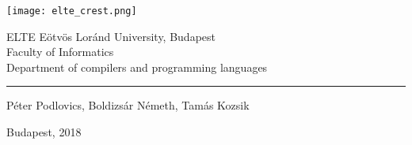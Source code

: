 \documentclass[main.tex]{subfiles}
\begin{document}
	\newcommand{\DEPARTMENT}[0]{Department of compilers and programming languages}
	
	\begin{titlepage}
		
		\begin{minipage}{0.3\linewidth}
			\texttt{[image: elte\_crest.png]}
		\end{minipage}
		\begin{minipage}{0.7\linewidth}
			\begin{center}
				\large
				ELTE Eötvös Loránd University, Budapest \\
				Faculty of Informatics \\
				\DEPARTMENT
			\end{center}
		\end{minipage}
		
		\hrule
		\vfill
		
		\begin{center}
			\Huge
			\makeatletter
			\textbf{\@title}
			\makeatother
			\normalsize
		\end{center}
		
		\hspace{3cm}
		
		\begin{center}
			\LARGE
			Péter Podlovics, Boldizsár Németh, Tamás Kozsik
		\end{center}
		
		\vfill
		
		\begin{center}
			\large
			Budapest, 2018
		\end{center}
		
	\end{titlepage}
	
\end{document}

